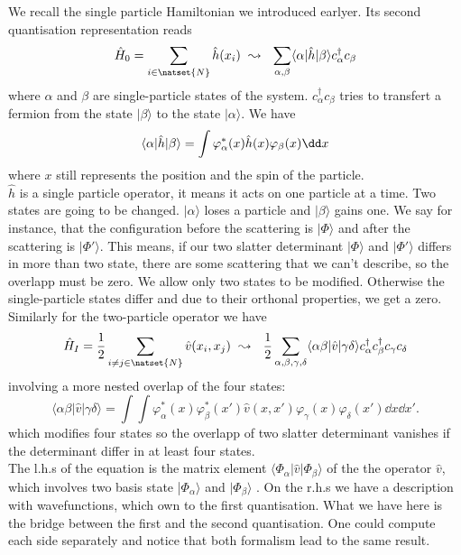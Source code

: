 \documentclass[../main.tex]{subfile}
\begin{document}
We recall the single particle Hamiltonian we introduced earlyer. Its second quantisation representation reads
\[
    \hat{H}_0 = \sum_{i \in \natset{N}} \hat{h}(x_i) ~ \leadsto ~~ \sum_{\alpha,\beta} \langle \alpha|\hat{h}|\beta\rangle c_{\alpha}^{\dagger}c_{\beta}
\] 
where $\alpha$ and $\beta$ are single-particle states of the system. $c_{\alpha}^{\dagger}c_{\beta}$ tries to transfert a fermion
from the state $|\beta\rangle$ to the state $|\alpha\rangle$.
We have
\[
    \langle \alpha|\hat{h}|\beta\rangle = \int  \varphi_{\alpha}^{\ast}(x) \hat{h}(x) \varphi_{\beta}(x) \dd x\\
\]
where $x$ still represents the position and the spin of the particle.\\
$\hat{h}$ is a single particle operator, it means it acts on one particle at a time.
Two states are going to be changed. $|\alpha\rangle$ loses a particle and $|\beta\rangle$ gains one. We say for instance, that the 
configuration before the scattering is $|\Phi\rangle$ and after the scattering is $|\Phi'\rangle$. 
This means, if our two slatter determinant $|\Phi\rangle$ and $|\Phi'\rangle$ differs in more than two state, there are
some scattering that we can't describe, so the overlapp must be zero. We allow only two states to be modified. Otherwise the single-particle
states differ and due to their orthonal properties, we get a zero.\\

Similarly for the two-particle operator we have
\[
    \hat{H}_I = \frac{1}{2}\sum_{i\neq j \in \natset{N}} \hat{v}(x_i, x_j) ~ \leadsto ~~ \frac{1}{2}\sum_{\alpha,\beta,\gamma,\delta} \langle \alpha\beta|\hat{v}|\gamma\delta\rangle c_{\alpha}^{\dagger}c_{\beta}^{\dagger}c_{\gamma}c_{\delta}
\]
involving a more nested overlap of the four states:
\[
    \langle\alpha\beta|\hat{v}|\gamma\delta\rangle = \int \int \varphi_{\alpha}^{\ast}(x) \varphi_{\beta}^{\ast}(x') \hat{v}(x,x') \varphi_{\gamma}(x) \varphi_{\delta}(x') \dd x \dd x'.
\]
which modifies four states so the overlapp of two slatter determinant vanishes if the determinant differ in at least four states.\\ 

The l.h.s of the equation is the matrix element $\langle\Phi_{\alpha}|\hat{v}|\Phi_{\beta}\rangle$ of the the operator
 $\hat{v}$, which involves two basis state |$\Phi_{\alpha}\rangle$ and $|\Phi_{\beta}\rangle$ .
On the r.h.s we have a description with wavefunctions, which own to the first quantisation. What we have here
is the bridge between the first and the second quantisation. One could compute each side separately and notice
that both formalism lead to the same result.\\
\end{document}
